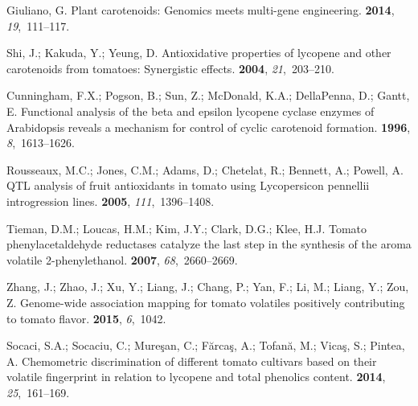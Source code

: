 \documentclass[applsci,article,accept,moreauthors,pdftex]{Definitions/mdpi}
\begin{document}
{\begin{thebibliography}{999}
{
Giuliano, G.
\newblock Plant carotenoids: Genomics meets multi-gene engineering.
 {\bf 2014}, {\em
  19},~111--117.

Shi, J.; Kakuda, Y.; Yeung, D.
\newblock Antioxidative properties of lycopene and other carotenoids from
  tomatoes: Synergistic effects.
 {\bf 2004}, {\em 21},~203--210.

Cunningham, F.X.; Pogson, B.; Sun, Z.; McDonald, K.A.; DellaPenna, D.; Gantt,
  E.
\newblock Functional analysis of the beta and epsilon lycopene cyclase enzymes
  of Arabidopsis reveals a mechanism for control of cyclic carotenoid
  formation.
 {\bf 1996}, {\em 8},~1613--1626.

Rousseaux, M.C.; Jones, C.M.; Adams, D.; Chetelat, R.; Bennett, A.; Powell, A.
\newblock QTL analysis of fruit antioxidants in tomato using Lycopersicon
  pennellii introgression lines.
 {\bf 2005}, {\em
  111},~1396--1408.

Tieman, D.M.; Loucas, H.M.; Kim, J.Y.; Clark, D.G.; Klee, H.J.
\newblock Tomato phenylacetaldehyde reductases catalyze the last step in the
  synthesis of the aroma volatile 2-phenylethanol.
 {\bf 2007}, {\em 68},~2660--2669.

Zhang, J.; Zhao, J.; Xu, Y.; Liang, J.; Chang, P.; Yan, F.; Li, M.; Liang, Y.;
  Zou, Z.
\newblock Genome-wide association mapping for tomato volatiles positively
  contributing to tomato flavor.
 {\bf 2015}, {\em 6},~1042.

Socaci, S.A.; Socaciu, C.; Mure{\c{s}}an, C.; F{\u{a}}rca{\c{s}}, A.;
  Tofan{\u{a}}, M.; Vica{\c{s}}, S.; Pintea, A.
\newblock Chemometric discrimination of different tomato cultivars based on
  their volatile fingerprint in relation to lycopene and total phenolics
  content.
 {\bf 2014}, {\em 25},~161--169.

}
\end{thebibliography}}
\end{document}
